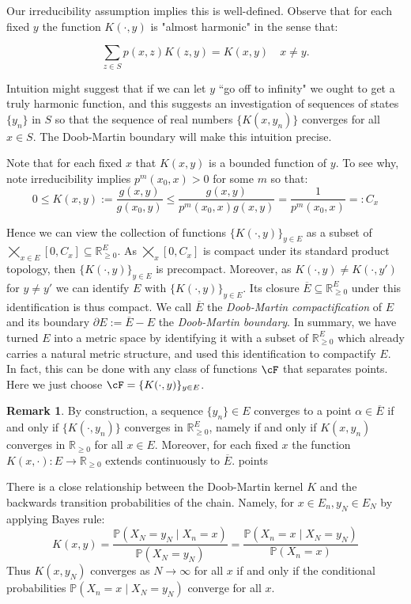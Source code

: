 \documentclass[11pt,oneside,reqno]{article}
\theoremstyle{plain}
\theoremstyle{definition}
\newtheorem{remark}[theorem]{Remark}
\numberwithin{equation}{section}
\renewcommand{\leq}{\leqslant}
\renewcommand{\geq}{\geqslant}
\newcommand{\R}{\mathbb{R}}
\renewcommand{\P}{\mathbb{P}}
\begin{document}
%
\noindent Our irreducibility assumption implies this is well-defined. Observe that for each fixed $y$ the function $K(\cdot, y)$ is "almost harmonic" in the sense that:

\begin{equation*}
    \sum_{z \in S} p(x,z)K(z, y) = K(x,y) \quad x \neq y. 
\end{equation*}


\noindent Intuition might suggest that if we can let $y$ ``go off to infinity" we ought to get a truly harmonic function, and this suggests an investigation of sequences of states $\{y_n\}$ in $S$ so that the sequence of real numbers $\{K(x, y_n)\}$ converges for all $x\in S$. The Doob-Martin boundary will make this intuition precise. 

\indent Note that for each fixed $x$ that $K(x, y)$ is a bounded function of $y$. To see why, note irreducibility implies $p^m(x_0, x) > 0$ for some $m$ so that: 
%
\[0 \leq K(x,y) := \frac{g(x,y)}{g(x_0, y)} \leq \frac{g(x,y)}{p^m(x_0, x) g(x,y)} = \frac{1}{p^m(x_0,x)} =: C_x\]

%
\noindent Hence we can view the collection of functions $\{K(\cdot, y) \}_{y \in E}$ as a subset of $\bigtimes_{x \in E} [0, C_x] \subseteq \R^E_{\geq0}$. As $\bigtimes_x [0,C_x]$ is compact under its standard product topology, then $\{K(\cdot, y) \}_{y \in E}$ is precompact. Moreover, as $K(\cdot, y) \neq K(\cdot, y')$ for $y \neq y'$ we can identify $E$ with $\{K(\cdot, y) \}_{y \in E}$. Its closure $\overline{E} \subseteq \R^E_{\geq 0}$ under this identification is thus compact. We call $\overline{E}$ the \textit{Doob-Martin compactification} of $E$ and its boundary $\partial E := \overline{E} - E$ the \textit{Doob-Martin boundary}. In summary, we have turned $E$ into a metric space by identifying it with a subset of $\R^{E}_{\geq 0}$ which already carries a natural metric structure, and used this identification to compactify $E$. In fact, this can be done with any class of functions $\cF$ that separates points. Here we just choose $\cF = \{K(\cdot, y)\}_{y \in E}$.

%
\begin{remark}
    By construction, a sequence $\{y_n\} \in E$ converges to a point $\alpha \in \overline{E}$ if and only if $\{K(\cdot, y_n)\}$ converges in $\R^E_{\geq 0}$, namely if and only if $K(x, y_n)$ converges in $\R_{\geq 0}$ for all $x \in E$. Moreover, for each fixed $x$ the function $K(x, \cdot) : E \to \R_{\geq 0}$ extends continuously to $\overline{E}$.  points
    \label{rmk:conv_in_dm}
\end{remark}
%
%
\noindent There is a close relationship between the Doob-Martin kernel $K$ and the backwards transition probabilities of the chain. Namely, for $x \in E_n, y_N \in E_{N}$ by applying Bayes rule:
%
\[K(x,y) = \frac{\P(X_{N} = y_N \; | \; X_n = x)}{\P(X_{N} = y_N)} = \frac{\P(X_n = x \; | \; X_{N} = y_N)}{\P(X_n = x)}\]
%
\noindent Thus $K(x, y_N)$ converges as $N \to \infty$ for all $x$ if and only if the conditional probabilities $\P(X_n = x \; | \; X_N = y_N)$ converge for all $x$. 
\end{document}
